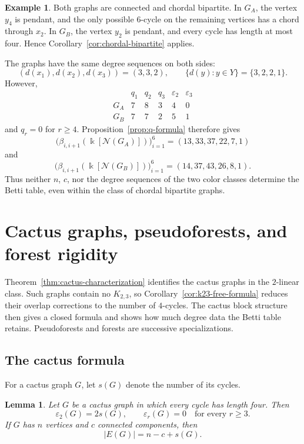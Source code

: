 \documentclass[11pt]{amsart}
\newtheorem{lemma}[theorem]{Lemma}
\theoremstyle{definition}
\newtheorem{example}[theorem]{Example}
\theoremstyle{remark}
\numberwithin{equation}{section}
\newcommand{\NN}{\mathcal N}
\begin{document}
\begin{example}
		Both graphs are connected and chordal bipartite. In \(G_A\), the vertex
		\(y_4\) is pendant, and the only possible \(6\)-cycle on the remaining
		vertices has a chord through \(x_2\). In \(G_B\), the vertex \(y_2\) is
		pendant, and every cycle has length at most four. Hence
		Corollary~\ref{cor:chordal-bipartite} applies.
		
		The graphs have the same degree sequences on both sides:
		\[
		(d(x_1),d(x_2),d(x_3))=(3,3,2),\qquad
		\{d(y):y\in Y\}=\{3,2,2,1\}.
		\]
		However,
		\[
		\begin{array}{c|ccc|cc}
			&q_1&q_2&q_3&\varepsilon_2&\varepsilon_3\\ \hline
			G_A&7&8&3&4&0\\
			G_B&7&7&2&5&1
		\end{array}
		\]
		and \(q_r=0\) for \(r\ge4\). Proposition~\ref{prop:q-formula} therefore gives
		\[
		\bigl(\beta_{i,i+1}(\Bbbk[\NN(G_A)])\bigr)_{i=1}^{6}
		=(13,33,37,22,7,1)
		\]
		and
		\[
		\bigl(\beta_{i,i+1}(\Bbbk[\NN(G_B)])\bigr)_{i=1}^{6}
		=(14,37,43,26,8,1).
		\]
		Thus neither \(n\), \(c\), nor the degree sequences of the two color
		classes determine the Betti table, even within the class of chordal bipartite
		graphs.
	\end{example}
	
	\section{Cactus graphs, pseudoforests, and forest rigidity}\label{sec:pseudoforests}

	Theorem~\ref{thm:cactus-characterization} identifies the cactus graphs in the
	\(2\)-linear class. Such graphs contain no \(K_{2,3}\), so
	Corollary~\ref{cor:k23-free-formula} reduces their overlap corrections to the
	number of \(4\)-cycles. The cactus block structure then gives a closed formula
	and shows how much degree data the Betti table retains. Pseudoforests and
	forests are successive specializations.

	\subsection{The cactus formula}

	For a cactus graph \(G\), let \(s(G)\) denote the number of its cycles.

	\begin{lemma}\label{lem:cactus-overlaps}
		Let \(G\) be a cactus graph in which every cycle has length four. Then
		\[
		\varepsilon_2(G)=2s(G),
		\qquad
		\varepsilon_r(G)=0\quad\text{for every }r\ge3.
		\]
		If \(G\) has \(n\) vertices and \(c\) connected components, then
		\[
		|E(G)|=n-c+s(G).
		\]
	\end{lemma}
\end{document}
